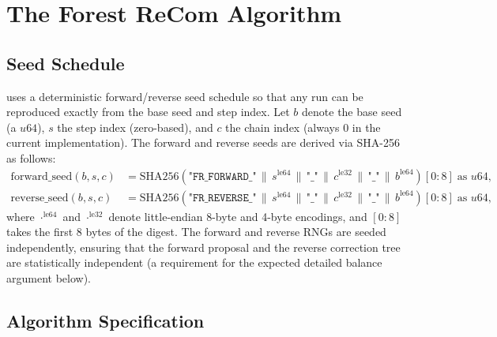 \section{The Forest ReCom Algorithm}
\label{sec:algorithm}

\subsection{Seed Schedule}

\fr{} uses a deterministic forward/reverse seed schedule so that any run
can be reproduced exactly from the base seed and step index.
Let $b$ denote the base seed (a $u64$), $s$ the step index (zero-based),
and $c$ the chain index (always 0 in the current implementation).
The forward and reverse seeds are derived via SHA-256 as follows:
\begin{align*}
  \mathrm{forward\_seed}(b, s, c) &= \mathrm{SHA256}\!\left(
    \texttt{"FR\_FORWARD\_"} \,\|\, s^{\mathrm{le64}} \,\|\,
    \texttt{"\_"} \,\|\, c^{\mathrm{le32}} \,\|\,
    \texttt{"\_"} \,\|\, b^{\mathrm{le64}}
  \right)[0{:}8]\;\text{as }u64, \\
  \mathrm{reverse\_seed}(b, s, c) &= \mathrm{SHA256}\!\left(
    \texttt{"FR\_REVERSE\_"} \,\|\, s^{\mathrm{le64}} \,\|\,
    \texttt{"\_"} \,\|\, c^{\mathrm{le32}} \,\|\,
    \texttt{"\_"} \,\|\, b^{\mathrm{le64}}
  \right)[0{:}8]\;\text{as }u64,
\end{align*}
where $\cdot^{\mathrm{le64}}$ and $\cdot^{\mathrm{le32}}$ denote little-endian
8-byte and 4-byte encodings, and $[0{:}8]$ takes the first 8 bytes of the
digest.
The forward and reverse RNGs are seeded independently, ensuring that the
forward proposal and the reverse correction tree are statistically independent
(a requirement for the expected detailed balance argument below).

\subsection{Algorithm Specification}

